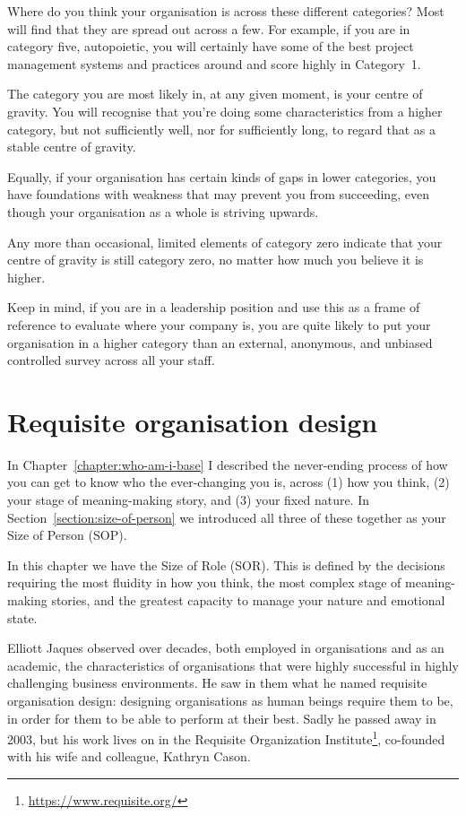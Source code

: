 Where do you think your organisation is across these different categories? Most will find that they are spread out across a few. For example, if you are in category five, autopoietic, you will certainly have some of the best project management systems and practices around and score highly in Category~1.


The category you are most likely in, at any given moment, is your centre of gravity. You will recognise that you’re doing some characteristics from a higher category, but not sufficiently well, nor for sufficiently long, to regard that as a stable centre of gravity.


Equally, if your organisation has certain kinds of gaps in lower categories, you have foundations with weakness that may prevent you from succeeding, even though your organisation as a whole is striving upwards.


 Any more than occasional, limited elements of category zero indicate that your centre of gravity is still category zero, no matter how much you believe it is higher.


Keep in mind, if you are in a leadership position and use this as a frame of reference to evaluate where your company is, you are quite likely to put your organisation in a higher category than an external, anonymous, and unbiased controlled survey across all your staff.
\section{Requisite organisation design}
In Chapter~\ref{chapter:who-am-i-base} I described the never-ending process of how you can get to know who the ever-changing you is, across (1) how you think, (2) your stage of meaning\hyp{}making story, and (3) your fixed nature. In Section~\ref{section:size-of-person} we introduced all three of these together as your Size of Person (SOP).


In this chapter we have the Size of Role (SOR). This is defined by the decisions requiring the most fluidity in how you think, the most complex stage of meaning\hyp{}making stories, and the greatest capacity to manage your nature and emotional state.


Elliott Jaques observed over decades, both employed in organisations and as an academic, the characteristics of organisations that were highly successful in highly challenging business environments. He saw in them what he named requisite organisation design: designing organisations as human beings require them to be, in order for them to be able to perform at their best. Sadly he passed away in 2003, but his work lives on in the Requisite Organization Institute\footnote{\url{https://www.requisite.org/}},  co-founded with his wife and colleague, Kathryn Cason.


